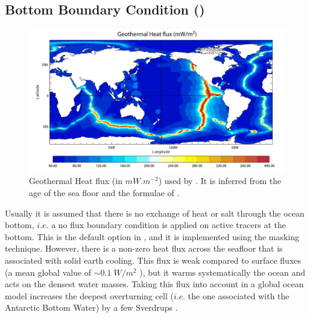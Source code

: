 \subsection   [Bottom Boundary Condition (\textit{trabbc})]
			{Bottom Boundary Condition ()}
\label{TRA_bbc}
\begin{figure}[!t] 	  \begin{center}
\includegraphics[width=1.0\textwidth]{./TexFiles/Figures/Fig_TRA_geoth.pdf}
\caption{ 	\label{Fig_geothermal}
Geothermal Heat flux (in $mW.m^{-2}$) used by \cite{Emile-Geay_Madec_OS09}.
It is inferred from the age of the sea floor and the formulae of \citet{Stein_Stein_Nat92}.}
\end{center}   \end{figure}

Usually it is assumed that there is no exchange of heat or salt through 
the ocean bottom, $i.e.$ a no flux boundary condition is applied on active 
tracers at the bottom. This is the default option in \NEMO, and it is 
implemented using the masking technique. However, there is a 
non-zero heat flux across the seafloor that is associated with solid 
earth cooling. This flux is weak compared to surface fluxes (a mean 
global value of $\sim0.1\;W/m^2$ \citep{Stein_Stein_Nat92}), but it warms 
systematically the ocean and acts on the densest water masses. 
Taking this flux into account in a global ocean model increases
the deepest overturning cell ($i.e.$ the one associated with the Antarctic 
Bottom Water) by a few Sverdrups  \citep{Emile-Geay_Madec_OS09}. 

